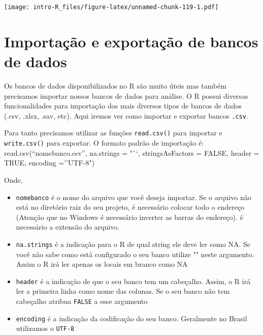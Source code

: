 \documentclass[]{book}
\newenvironment{Shaded}{\begin{snugshade}}{\end{snugshade}}
\newcommand{\DataTypeTok}[1]{\textcolor[rgb]{0.13,0.29,0.53}{#1}}
\newcommand{\DecValTok}[1]{\textcolor[rgb]{0.00,0.00,0.81}{#1}}
\newcommand{\KeywordTok}[1]{\textcolor[rgb]{0.13,0.29,0.53}{\textbf{#1}}}
\newcommand{\NormalTok}[1]{#1}
\newcommand{\OperatorTok}[1]{\textcolor[rgb]{0.81,0.36,0.00}{\textbf{#1}}}
\newcommand{\StringTok}[1]{\textcolor[rgb]{0.31,0.60,0.02}{#1}}
\providecommand{\tightlist}{%
  \setlength{\itemsep}{0pt}\setlength{\parskip}{0pt}}
\theoremstyle{definition}
\theoremstyle{definition}
\theoremstyle{definition}
\theoremstyle{remark}
\begin{document}
\begin{Shaded}
\end{Shaded}

\texttt{[image: intro-R\_files/figure-latex/unnamed-chunk-119-1.pdf]}

\hypertarget{impor}{%
\section{Importação e exportação de bancos de dados}\label{impor}}

Os bancos de dados disponibilizados no R são muito úteis mas também precisamos importar nossos bancos de dados para análise. O R possui diversas funcionalidades para importação dos mais diversos tipos de bancos de dados (.csv, .xlsx, .sav, etc). Aqui iremos ver como importar e exportar bancos \texttt{.csv}.

Para tanto precisamos utilizar as funções \texttt{read.csv()} para importar e \texttt{write.csv()} para exportar. O formato padrão de importação é:
read.csv(``nomebanco.csv'', na.strings = "``, stringsAsFactors = FALSE, header = TRUE, encoding =''UTF-8")

Onde,

\begin{itemize}
\tightlist
\item
  \texttt{nomebanco} é o nome do arquivo que você deseja importar. Se o arquivo não está no diretório raiz do seu projeto, é necessário colocar todo o endereço (Atenção que no Windows é necessário inverter as barras do endereço). é necessário a extensão do arquivo.
\item
  \texttt{na.strings} é a indicação para o R de qual string ele deve ler como NA. Se você não sabe como está configurado o seu banco utilize "" neste argumento. Assim o R irá ler apenas os locais em branco como NA
\item
  \texttt{header} é a indicação de que o seu banco tem um cabeçalho. Assim, o R irá ler a primeira linha como nome das colunas. Se o seu banco não tem cabeçalho atribua \texttt{FALSE} a esse argumento
\item
  \texttt{encoding} é a indicação da codificação do seu banco. Geralmente no Brasil utilizamos o \texttt{UTF-8}
\end{itemize}
\end{document}
